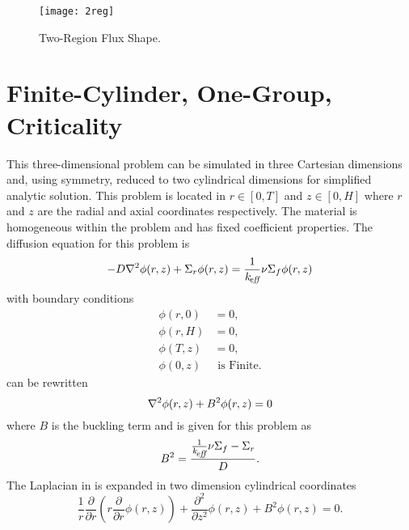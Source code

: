   \begin{figure}
    \centering
    \texttt{[image: 2reg]}
    \caption{Two-Region Flux Shape.}
    \label{fig:2reg}
  \end{figure}

\section{Finite-Cylinder, One-Group, Criticality}
  \label{sec:deriv_finite_cyl}
  This three-dimensional problem can be simulated in three Cartesian dimensions 
  and, using symmetry, reduced to two cylindrical dimensions for simplified 
  analytic solution. This problem is located in $r \in [0,T]$ and $z \in [0,H]$
  where $r$ and $z$ are the radial and axial coordinates respectively. The
  material is homogeneous within the problem and has fixed coefficient
  properties. The diffusion equation for this problem is 
  \begin{equation}
    \label{eq:finite_cyl}
    -D \mathbf{\nabla}^2 \phi(r,z) + \Sigma_r \phi(r,z) = \frac{1}{k_{\!\mbox{\scriptsize \em eff}}} \nu \Sigma_f
      \phi(r,z)
  \end{equation}
  with boundary conditions
  \begin{align}
    \label{eq:finite_cyl_bcz0}
    \phi(r,0) &= 0 ,\\
    \label{eq:finite_cyl_bczH}
    \phi(r,H) &= 0 ,\\
    \label{eq:finite_cyl_bcrT}
    \phi(T,z) &= 0 ,\\
    \label{eq:finite_cyl_bcr0}
    \phi(0,z) & \text{ is Finite}.
  \end{align}
   can be rewritten
  \begin{equation}
    \label{eq:finite_cyl_buckle}
    \mathbf{\nabla}^2 \phi(r,z) + B^2 \phi(r,z) = 0
  \end{equation}
  where $B$ is the buckling term and is given for this problem as
  \begin{equation}
    \label{eq:finite_cyl_b2}
    B^2 = \frac{\frac{1}{k_{\!\mbox{\scriptsize \em eff}}} \nu \Sigma_f - \Sigma_r }{D}.
  \end{equation}
  The Laplacian in  is expanded in two dimension
  cylindrical coordinates
  \begin{equation}
    \label{eq:finite_cyl_deriv}
    \frac{1}{r} \frac{\partial}{\partial r} \left( r \frac{\partial}{\partial r}
      \phi(r,z) \right) + \frac{\partial^2}{\partial z^2} \phi(r,z) + 
      B^2 \phi(r,z) = 0.
  \end{equation}
